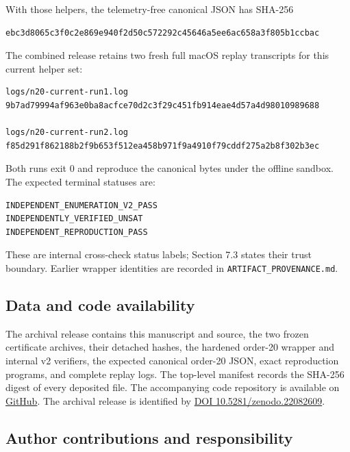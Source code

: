 \documentclass[
  english,
  11pt,
  a4paper,
]{article}
\begin{document}
With those helpers, the telemetry-free canonical JSON has SHA-256

\begin{verbatim}
ebc3d8065c3f0c2e869e940f2d50c572292c45646a5ee6ac658a3f805b1ccbac
\end{verbatim}

The combined release retains two fresh full macOS replay transcripts for
this current helper set:

\begin{verbatim}
logs/n20-current-run1.log
9b7ad79994af963e0ba8acfce70d2c3f29c451fb914eae4d57a4d98010989688

logs/n20-current-run2.log
f85d291f862188b2f9b653f512ea458b971f9a4910f79cddf275a2b8f302b3ec
\end{verbatim}

Both runs exit 0 and reproduce the canonical bytes under the offline
sandbox. The expected terminal statuses are:

\begin{verbatim}
INDEPENDENT_ENUMERATION_V2_PASS
INDEPENDENTLY_VERIFIED_UNSAT
INDEPENDENT_REPRODUCTION_PASS
\end{verbatim}

These are internal cross-check status labels; Section 7.3 states their
trust boundary. Earlier wrapper identities are recorded in
\texttt{ARTIFACT\_PROVENANCE.md}.

\subsection{Data and code
availability}\label{data-and-code-availability}

The archival release contains this manuscript and source, the two frozen
certificate archives, their detached hashes, the hardened order-20
wrapper and internal v2 verifiers, the expected canonical order-20 JSON,
exact reproduction programs, and complete replay logs. The top-level
manifest records the SHA-256 digest of every deposited file. The
accompanying code repository is available on
\href{https://github.com/shblue21/s16-s20-laplacian-certified-proofs}{GitHub}.
The archival release is identified by
\href{https://doi.org/10.5281/zenodo.22082609}{DOI
10.5281/zenodo.22082609}.

\subsection{Author contributions and
responsibility}\label{author-contributions-and-responsibility}
\end{document}
